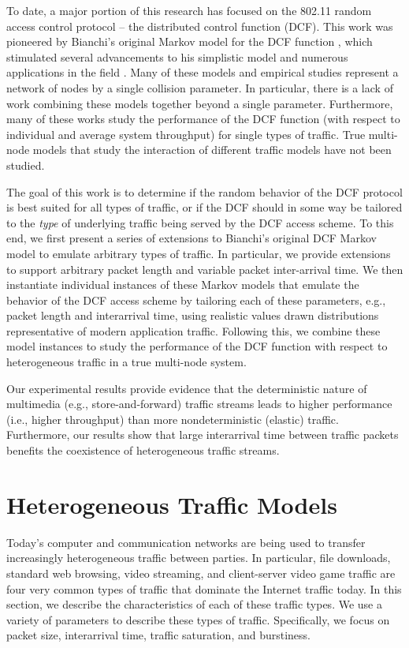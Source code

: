 \documentclass{llncs}
\begin{document}
To date, a major portion of this research has focused on the 802.11 random access control protocol -- the distributed control function (DCF). This work was pioneered by Bianchi's original Markov model for the DCF function \cite{bianchi1996performance}, which stimulated several advancements to his simplistic model \cite{bianchi1998ieee} and numerous applications in the field \cite{crow1996performance,chhaya1997performance}. Many of these models and empirical studies represent a network of nodes by a single collision parameter. In particular, there is a lack of work combining these models together beyond a single parameter. Furthermore, many of these works study the performance of the DCF function (with respect to individual and average system throughput) for single types of traffic. True multi-node models that study the interaction of different traffic models have not been studied.

The goal of this work is to determine if the random behavior of the DCF protocol is best suited for all types of traffic, or if the DCF should in some way be tailored to the \emph{type} of underlying traffic being served by the DCF access scheme. To this end, we first present a series of extensions to Bianchi's original DCF Markov model to emulate arbitrary types of traffic. In particular, we provide extensions to support arbitrary packet length and variable packet inter-arrival time. We then instantiate individual instances of these Markov models that emulate the behavior of the DCF access scheme by tailoring each of these parameters, e.g., packet length and interarrival time, using realistic values drawn distributions representative of modern application traffic. Following this, we combine these model instances to study the performance of the DCF function with respect to heterogeneous traffic in a true multi-node system. 

Our experimental results provide evidence that the deterministic nature of multimedia (e.g., store-and-forward) traffic streams leads to higher performance (i.e., higher throughput) than more nondeterministic (elastic) traffic. Furthermore, our results show that large interarrival time between traffic packets benefits the coexistence of heterogeneous traffic streams. 

\section{Heterogeneous Traffic Models}
Today's computer and communication networks are being used to transfer increasingly heterogeneous traffic between parties. In particular, file downloads, standard web browsing, video streaming, and client-server video game traffic are four very common types of traffic that dominate the Internet traffic today. In this section, we describe the characteristics of each of these traffic types. We use a variety of parameters to describe these types of traffic. Specifically, we focus on packet size, interarrival time, traffic saturation, and burstiness. \\
\end{document}
